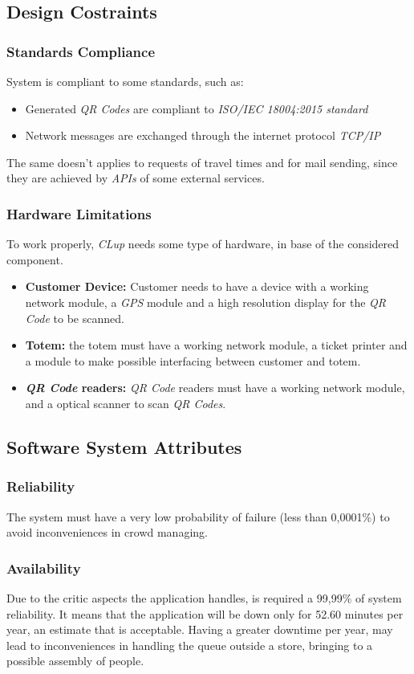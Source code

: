 \documentclass{article}
\begin{document}
	\newpage
	
	\subsection{Design Costraints}
		\subsubsection{Standards Compliance}
	System is compliant to some standards, such as:
	\begin{itemize}
		\item Generated \emph{QR Codes} are compliant to \emph{ISO/IEC 18004:2015 standard}
		\item Network messages are exchanged through the internet protocol \emph{TCP/IP}
	\end{itemize}
The same doesn't applies to requests of travel times and for mail sending, since they are achieved by \emph{APIs} of some external services.
		\subsubsection{Hardware Limitations}
		To work properly, \emph{CLup} needs some type of hardware, in base of the considered component.
		\begin{itemize}
			\item {\bfseries Customer Device:} Customer needs to have a device with a working network module, a \emph{GPS} module and a high resolution display for the \emph{QR Code} to be scanned.
			\item {\bfseries Totem:} the totem must have a working network module, a ticket printer and a module to make possible interfacing between customer and totem.
			\item {\bfseries \emph{QR Code} readers:} \emph{QR Code} readers must have a working network module, and a optical scanner to scan \emph{QR Codes}. 
		\end{itemize}
	\bigskip
	
	\subsection{Software System Attributes}
		\subsubsection{Reliability}
		The system must have a  very low probability of failure (less than 0,0001\%) to avoid inconveniences in crowd managing.
		\subsubsection{Availability}
		Due to the critic aspects the application handles, is required a 99,99\% of system reliability. It means that the application will be down only for 52.60 minutes per year, an estimate that is acceptable. Having a greater downtime per year, may lead to inconveniences in handling the queue outside a store, bringing to a possible assembly of people.
\end{document}
